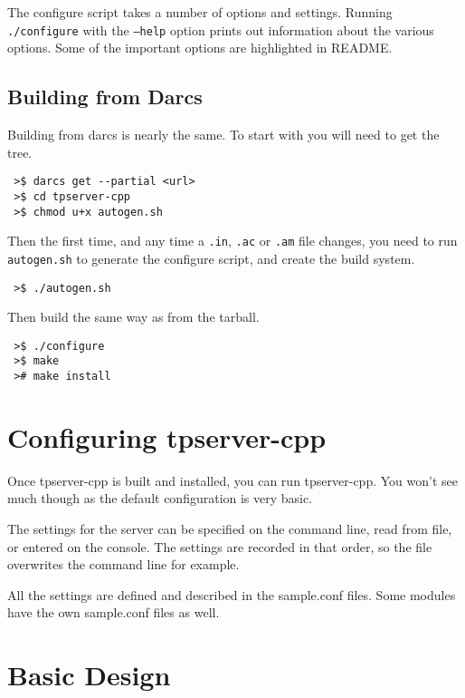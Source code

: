 \documentclass[a4paper,11pt]{report}
\begin{document}
The configure script takes a number of options and settings. Running \texttt{./configure} with the  \texttt{--help} option prints out information about the various options. Some of the important options are highlighted in README.

\section{Building from Darcs}
\label{sec:build-darcs}

Building from darcs is nearly the same.  To start with you will need to get the tree.

\begin{verbatim}
 >$ darcs get --partial <url>
 >$ cd tpserver-cpp
 >$ chmod u+x autogen.sh
\end{verbatim}

Then the first time, and any time a \texttt{.in}, \texttt{.ac} or \texttt{.am} file changes, you need to run \texttt{autogen.sh} to generate the configure script, and create the build system.

\begin{verbatim}
 >$ ./autogen.sh
\end{verbatim}

Then build the same way as from the tarball.

\begin{verbatim}
 >$ ./configure
 >$ make
 ># make install
\end{verbatim}

\chapter{Configuring tpserver-cpp}
\label{chap:configure}

Once tpserver-cpp is built and installed, you can run tpserver-cpp.  You won't see much though as the default configuration is very basic.

The settings for the server can be specified on the command line, read from file, or entered on the console. The settings are recorded in that order, so the file overwrites the command line for example.

All the settings are defined and described in the sample.conf files. Some modules have the own sample.conf files as well.

\chapter{Basic Design}
\label{chap:design-basic}
\end{document}
